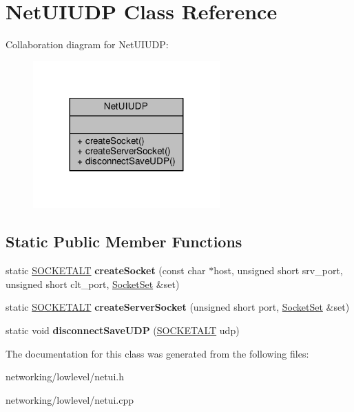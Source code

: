 \hypertarget{classNetUIUDP}{}\section{Net\+U\+I\+U\+DP Class Reference}
\label{classNetUIUDP}


Collaboration diagram for Net\+U\+I\+U\+DP\+:
\nopagebreak
\begin{figure}[H]
\begin{center}
\leavevmode
\includegraphics[width=203pt]{dc/dd2/classNetUIUDP__coll__graph}
\end{center}
\end{figure}
\subsection*{Static Public Member Functions}
\begin{DoxyCompactItemize}
\item 
static \hyperlink{classSOCKETALT}{S\+O\+C\+K\+E\+T\+A\+LT} {\bfseries create\+Socket} (const char $\ast$host, unsigned short srv\+\_\+port, unsigned short clt\+\_\+port, \hyperlink{classSocketSet}{Socket\+Set} \&set)\hypertarget{classNetUIUDP_aab9e53d8cbdf6ebd77f3692d1d0804a5}{}\label{classNetUIUDP_aab9e53d8cbdf6ebd77f3692d1d0804a5}

\item 
static \hyperlink{classSOCKETALT}{S\+O\+C\+K\+E\+T\+A\+LT} {\bfseries create\+Server\+Socket} (unsigned short port, \hyperlink{classSocketSet}{Socket\+Set} \&set)\hypertarget{classNetUIUDP_a79ffe7591ba892aa33a5d8381f02d538}{}\label{classNetUIUDP_a79ffe7591ba892aa33a5d8381f02d538}

\item 
static void {\bfseries disconnect\+Save\+U\+DP} (\hyperlink{classSOCKETALT}{S\+O\+C\+K\+E\+T\+A\+LT} udp)\hypertarget{classNetUIUDP_ab47f9166b83aa71b5000b71e5695c23e}{}\label{classNetUIUDP_ab47f9166b83aa71b5000b71e5695c23e}

\end{DoxyCompactItemize}


The documentation for this class was generated from the following files\+:\begin{DoxyCompactItemize}
\item 
networking/lowlevel/netui.\+h\item 
networking/lowlevel/netui.\+cpp\end{DoxyCompactItemize}
